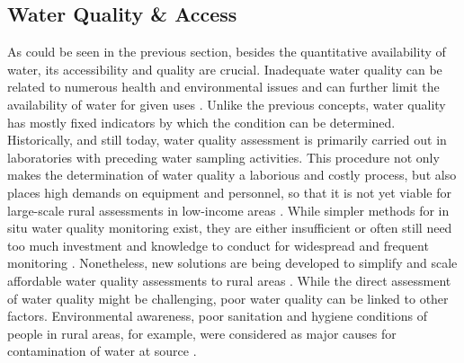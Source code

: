 
\subsection{Water Quality \& Access}\label{subsec:water_quality}

As could be seen in the previous section, besides the quantitative availability of water, its accessibility and quality are crucial. Inadequate water quality can be related to numerous health and environmental issues and can further limit the availability of water for given uses \autocite{rcrcFORECASTBASEDFINANCINGEARLY2020, faoCopingWaterScarcity2012}. Unlike the previous concepts, water quality has mostly fixed indicators by which the condition can be determined. Historically, and still today, water quality assessment is primarily carried out in laboratories with preceding water sampling activities. This procedure not only makes the determination of water quality a laborious and costly process, but also places high demands on equipment and personnel, so that it is not yet viable for large-scale rural assessments in low-income areas \autocite{tariqOpenSourceWater2021,wmoPlanningWaterqualityMonitoring2013}. While simpler methods for in situ water quality monitoring exist, they are either insufficient or often still need too much investment and knowledge to conduct for widespread and frequent monitoring \autocite{wmoPlanningWaterqualityMonitoring2013}. Nonetheless, new solutions are being developed to simplify and scale affordable water quality assessments to rural areas \autocite{ighaloComprehensiveReviewWater2020,tariqOpenSourceWater2021}. While the direct assessment of water quality might be challenging, poor water quality can be linked to other factors. Environmental awareness, poor sanitation and hygiene conditions of people in rural areas, for example, were considered as major causes for contamination of water at source \autocite{zamxakaMicrobiologicalPhysicochemicalAssessment2004}.


